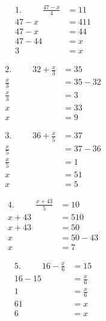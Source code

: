 
\begin{minipage}[t]{0.5\textwidth}
	\begin{align*}
		1.\hspace{30pt}\frac{47-x}{4}&=11\\
		47-x&=411\\
		47-x&=44\\
		47-44&=x\\
		3&=x
	\end{align*}
\end{minipage}
\begin{minipage}[t]{0.5\textwidth}
	\begin{align*}
		2.\hspace{30pt}32+\frac{x}{3}&=35\\
		\frac{x}{3}&=35-32\\
		\frac{x}{3}&=3\\
		x&=33\\
		x&=9
	\end{align*}
\end{minipage}
\vspace{10 mm}
\begin{minipage}[t]{0.5\textwidth}
	\begin{align*}
		3.\hspace{30pt}36+\frac{x}{5}&=37\\
		\frac{x}{5}&=37-36\\
		\frac{x}{5}&=1\\
		x&=51\\
		x&=5
	\end{align*}
\end{minipage}
\begin{minipage}[t]{0.5\textwidth}
	\begin{align*}
		4.\hspace{30pt}\frac{x+43}{5}&=10\\
		x+43&=510\\
		x+43&=50\\
		x&=50-43\\
		x&=7
	\end{align*}
\end{minipage}
\vspace{10 mm}
\begin{minipage}[t]{0.5\textwidth}
	\begin{align*}
		5.\hspace{30pt}16-\frac{x}{6}&=15\\
		16-15&=\frac{x}{6}\\
		1&=\frac{x}{6}\\
		61&=x\\
		6&=x
	\end{align*}
\end{minipage}
